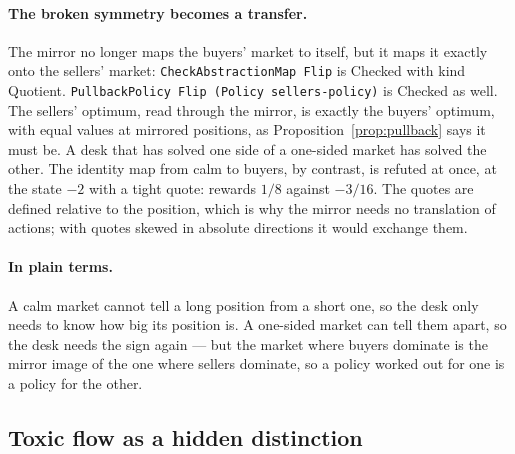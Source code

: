\documentclass[11pt]{article}
\newcommand{\code}[1]{\texttt{#1}}
\newcommand{\plain}{\paragraph{In plain terms.}}
\theoremstyle{definition}
\theoremstyle{plain}
\begin{document}
\paragraph{The broken symmetry becomes a transfer.} The mirror no longer maps the buyers' market to
itself, but it maps it exactly onto the sellers' market: \code{CheckAbstractionMap Flip} is Checked
with kind Quotient. \code{PullbackPolicy Flip (Policy sellers-policy)} is Checked as well. The sellers'
optimum, read through the mirror, is exactly the buyers' optimum, with equal values at mirrored
positions, as Proposition~\ref{prop:pullback} says it must be. A desk that has solved one side of a
one-sided market has solved the other. The identity map from calm to buyers, by contrast, is refuted at
once, at the state $-2$ with a tight quote: rewards $1/8$ against $-3/16$. The quotes are defined
relative to the position, which is why the mirror needs no translation of actions; with quotes skewed
in absolute directions it would exchange them.

\plain A calm market cannot tell a long position from a short one, so the desk only needs to know
how big its position is. A one-sided market can tell them apart, so the desk needs the sign again ---
but the market where buyers dominate is the mirror image of the one where sellers dominate, so a policy
worked out for one is a policy for the other.

\subsection{Toxic flow as a hidden distinction}
\end{document}
